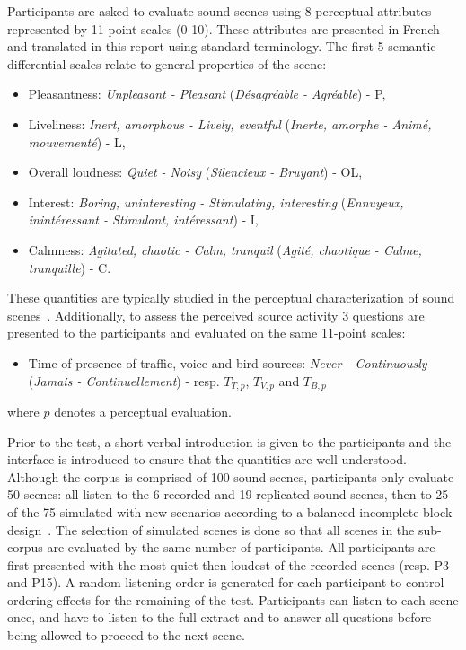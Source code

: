 \documentclass[twocolumn]{article}
\begin{document}
Participants are asked to evaluate sound scenes using 8 perceptual attributes represented by 11-point scales (0-10). These attributes are presented in French and translated in this report using standard terminology. The first 5 semantic differential scales relate to general properties of the scene:
\begin{itemize}
\item Pleasantness: \textit{Unpleasant - Pleasant} (\textit{D\'esagr\'eable - Agr\'eable}) - P,
\item Liveliness: \textit{Inert, amorphous - Lively, eventful} (\textit{Inerte, amorphe - Anim\'e, mouvement\'e}) - L,
\item Overall loudness: \textit{Quiet - Noisy} (\textit{Silencieux - Bruyant}) - OL,
\item Interest: \textit{Boring, uninteresting - Stimulating, interesting} (\textit{Ennuyeux, inint\'eressant - Stimulant, int\'eressant}) - I,
\item Calmness: \textit{Agitated, chaotic - Calm, tranquil} (\textit{Agit\'e, chaotique - Calme, tranquille}) - C.
\end{itemize}

These quantities are typically studied in the perceptual characterization of sound scenes~\cite{axelsson2010, aumond2017, nilsson2007}. Additionally, to assess the perceived source activity 3 questions are presented to the participants and evaluated on the same 11-point scales:
\begin{itemize}
\item Time of presence of traffic, voice and bird sources: \textit{Never - Continuously} (\textit{Jamais - Continuellement}) - resp. $T_{T, p}$, $T_{V, p}$ and $T_{B, p}$
\end{itemize}
where $p$ denotes a perceptual evaluation.

Prior to the test, a short verbal introduction is given to the participants and the interface is introduced to ensure that the quantities are well understood. Although the corpus is comprised of 100 sound scenes, participants only evaluate 50 scenes: all listen to the 6 recorded and 19 replicated sound scenes, then to 25 of the 75 simulated with new scenarios according to a balanced incomplete block design~\cite{dagnelie2003}. The selection of simulated scenes is done so that all scenes in the sub-corpus are evaluated by the same number of participants. All participants are first presented with the most quiet then loudest of the recorded scenes (resp. P3 and P15). A random listening order is generated for each participant to control ordering effects for the remaining of the test. Participants can listen to each scene once, and have to listen to the full extract and to answer all questions before being allowed to proceed to the next scene.
\end{document}
